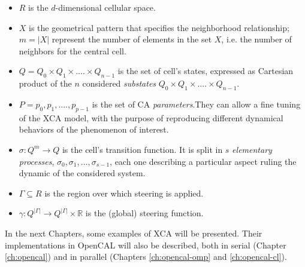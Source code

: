 \begin{itemize}

\item $R$ is the $d$-dimensional cellular space.

\item $X$ is the geometrical pattern that specifies the neighborhood
  relationship; $m = |X|$ represent the number of elements in the set
  $X$, i.e. the number of neighbors for the central cell.

\item $Q = Q_0 \times Q_1 \times....\times Q_{n-1}$ is the set of
  cell's states, expressed as Cartesian product of the $n$ considered
  \emph{substates} $Q_0 \times Q_1 \times....\times Q_{n-1}$.

\item $P = {p_0,p_1,....,p_{p-1}}$ is the set of CA
  \emph{parameters}.They can allow a fine tuning of the XCA model,
  with the purpose of reproducing different dynamical behaviors of
  the phenomenon of interest.

\item $\sigma : Q^m \rightarrow Q$ is the cell's transition function.
  It is split in $s$ \emph{elementary processes}, $\sigma_0,\sigma_1,
  ..., \sigma_{s-1}$, each one describing a particular aspect ruling
  the dynamic of the considered system.

\item $\Gamma \subseteq R$ is the region over which steering is applied.

\item $\gamma: Q^{|\Gamma|} \rightarrow Q^{|\Gamma|} \times
  \mathbb{R}$ is the (global) steering function.

\end{itemize}

In the next Chapters, some examples of XCA will be presented. Their
implementations in OpenCAL will also be described, both in serial
(Chapter \ref{ch:opencal}) and in parallel (Chapters
\ref{ch:opencal-omp} and \ref{ch:opencal-cl}).
